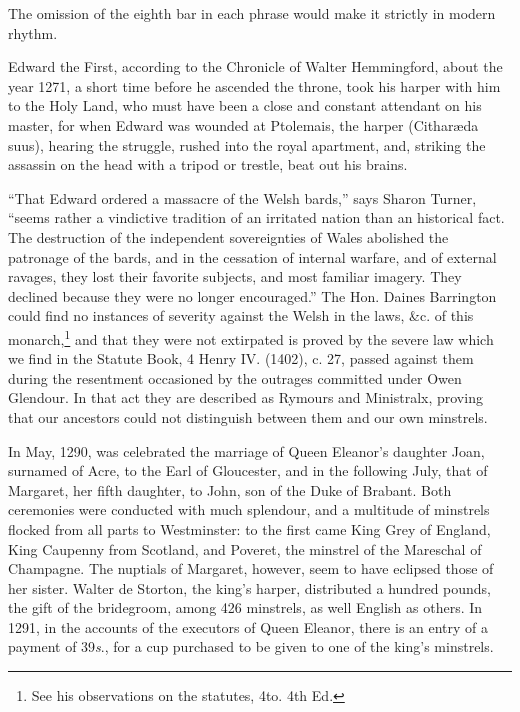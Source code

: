 The omission of the eighth bar in each phrase would make it strictly in modern
rhythm.




Edward the First, according to the Chronicle of Walter Hemmingford, about the
year 1271, a short time before he ascended the throne, took his harper with him
to the Holy Land, who must have been a close and constant attendant on his
master, for when Edward was wounded at Ptolemais, the harper (Citharæda
suus), hearing the struggle, rushed into the royal apartment, and, striking the
assassin on the head with a tripod or trestle, beat out his brains.

“That Edward ordered a massacre of the Welsh bards,” says Sharon Turner,
“seems rather a vindictive tradition of an irritated nation than an historical fact.
The destruction of the independent sovereignties of Wales abolished the patronage
of the bards, and in the cessation of internal warfare, and of external ravages,
they lost their favorite subjects, and most familiar imagery. They declined
because they were no longer encouraged.” The Hon. Daines Barrington could
find no instances of severity against the Welsh in the laws, \&c. of this monarch,\footnote{
See his observations on the statutes, 4to. 4th Ed.
}
and that they were not extirpated is proved by the severe law which we find in
the Statute Book, 4 Henry IV. (1402), c. 27, passed against them during the
resentment occasioned by the outrages committed under Owen Glendour. In that
act they are described as Rymours and Ministralx, proving that our ancestors
could not distinguish between them and our own minstrels.

In May, 1290, was celebrated the marriage of Queen Eleanor’s daughter Joan,
surnamed of Acre, to the Earl of Gloucester, and in the following July, that of
Margaret, her fifth daughter, to John, son of the Duke of Brabant. Both ceremonies
were conducted with much splendour, and a multitude of minstrels flocked
from all parts to Westminster: to the first came King Grey of England, King
Caupenny from Scotland, and Poveret, the minstrel of the Mareschal of Champagne.
The nuptials of Margaret, however, seem to have eclipsed those of her sister. 
Walter de Storton, the king’s harper, \pagebreak 
distributed a hundred pounds, the gift of
the bridegroom, among 426 minstrels, as well English as others. In 1291, in the
accounts of the executors of Queen Eleanor, there is an entry of a payment of
39\textit{s}., for a cup purchased to be given to one of the king’s minstrels.

